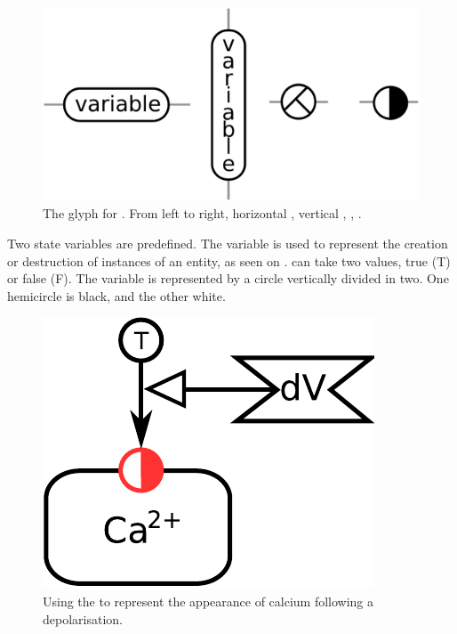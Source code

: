 \begin{figure}[H]
  \centering
  \includegraphics[scale = 0.3]{images/stateVariable}
  \caption{The \ER glyph for . From left to right, horizontal , vertical , , .}
  \label{fig:state-var}
\end{figure}

Two state variables are predefined. The variable  is used to represent the creation or destruction of instances of an entity, as seen on \label{sec:existence}.  can take two values, true (T) or false (F). The variable is represented by a circle vertically divided in two. One hemicircle is black, and the other white. 

\begin{figure}[H]
  \centering
  \includegraphics[scale = 0.5]{examples/ex-existence}
  \caption{Using the   to represent the appearance of calcium following a depolarisation.}
  \label{fig:ex-existence}
\end{figure}

